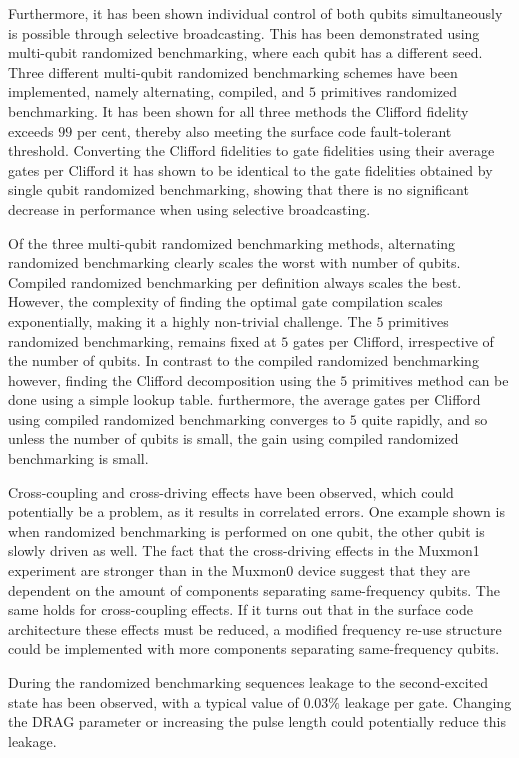     Furthermore, it has been shown individual control of both qubits simultaneously is possible through selective broadcasting. This has been demonstrated using multi-qubit randomized benchmarking, where each qubit has a different seed. Three different multi-qubit randomized benchmarking schemes have been implemented, namely alternating, compiled, and $5$ primitives randomized benchmarking. It has been shown for all three methods the Clifford fidelity exceeds $99$ per cent, thereby also meeting the surface code fault-tolerant threshold. Converting the Clifford fidelities to gate fidelities using their average gates per Clifford it has shown to be identical to the gate fidelities obtained by single qubit randomized benchmarking, showing that there is no significant decrease in performance when using selective broadcasting.

    Of the three multi-qubit randomized benchmarking methods, alternating randomized benchmarking clearly scales the worst with number of qubits. Compiled randomized benchmarking per definition always scales the best. However, the complexity of finding the optimal gate compilation scales exponentially, making it a highly non-trivial challenge. The $5$ primitives randomized benchmarking, remains fixed at $5$ gates per Clifford, irrespective of the number of qubits. In contrast to the compiled randomized benchmarking however, finding the Clifford decomposition using the $5$ primitives method can be done using a simple lookup table. furthermore, the average gates per Clifford using compiled randomized benchmarking converges to $5$ quite rapidly, and so unless the number of qubits is small, the gain using compiled randomized benchmarking is small.

    Cross-coupling and cross-driving effects have been observed, which could potentially be a problem, as it results in correlated errors. One example shown is when randomized benchmarking is performed on one qubit, the other qubit is slowly driven as well. The fact that the cross-driving effects in the Muxmon1 experiment are stronger than in the Muxmon0 device suggest that they are dependent on the amount of components separating same-frequency qubits. The same holds for cross-coupling effects. If it turns out that in the surface code architecture these effects must be reduced, a modified frequency re-use structure could be implemented with more components separating same-frequency qubits.

    During the randomized benchmarking sequences leakage to the second-excited state has been observed, with a typical value of $0.03\%$ leakage per gate. Changing the DRAG parameter or increasing the pulse length could potentially reduce this leakage.

